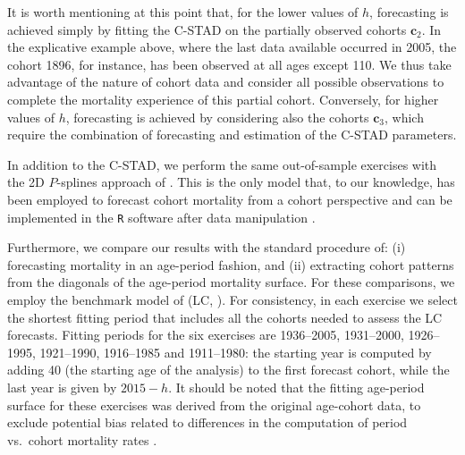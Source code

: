 \documentclass[11pt, a4paper]{article}
\begin{document}
It is worth mentioning at this point that, for the lower values of $h$, forecasting is achieved simply by fitting the C-STAD on the partially observed cohorts $\bm{c}_2$. In the explicative example above, where the last data available occurred in 2005, the cohort 1896, for instance, has been observed at all ages except 110. We thus take advantage of the nature of cohort data and consider all possible observations to complete the mortality experience of this partial cohort.  Conversely, for higher values of $h$, forecasting is achieved by considering also the cohorts $\bm{c}_3$, which require the combination of forecasting and estimation of the C-STAD parameters. 

In addition to the C-STAD, we perform the same out-of-sample exercises with the 2D $P$-splines approach of \cite{currie2004smoothing}. This is the only model that, to our knowledge, has been employed to forecast cohort mortality from a cohort perspective \citep{cmi2007stochastic} and can be implemented in the \texttt{R} software after data manipulation \cite[in the \texttt{MortalitySmooth} package,][]{camarda2012mortalitysmooth}. 

Furthermore, we compare our results with the standard procedure of: (i) forecasting mortality in an age-period fashion, and (ii) extracting cohort patterns from the diagonals of the age-period mortality surface. For these comparisons, we employ the benchmark model of \citeauthor{lee1992modeling} (LC, \citeyear{lee1992modeling}). For consistency, in each exercise we select the shortest fitting period that includes all the cohorts needed to assess the LC forecasts. Fitting periods for the six exercises are 1936--2005, 1931--2000, 1926--1995, 1921--1990, 1916--1985 and 1911--1980: the starting year is computed by adding 40 (the starting age of the analysis) to the first forecast cohort, while the last year is given by $2015 - h$. It should be noted that the fitting age-period surface for these exercises was derived from the original age-cohort data, to exclude potential bias related to differences in the computation of period vs.~cohort mortality rates \cite[see][pp.~29--33]{wilmoth2019protocol}. 

\end{document}
